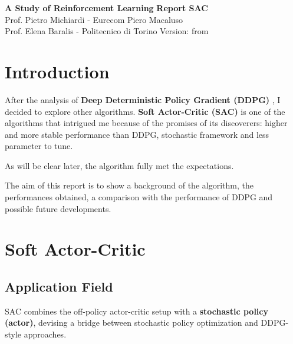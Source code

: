 \documentclass[a4paper, 11pt]{article}
\begin{document}
	\noindent
	\large\textbf{A Study of Reinforcement Learning} \hfill \textbf{Report SAC} \\
	\normalsize Prof. Pietro Michiardi - Eurecom \hfill   Piero Macaluso\\
	\normalsize Prof. Elena Baralis - Politecnico di Torino  \hfill Version: \vhCurrentVersion \space from \vhCurrentDate
	
	\tableofcontents
	\newpage
	\begin{versionhistory}
	\end{versionhistory}
	\newpage
	
	\section{Introduction} \label{introduction}
	
	After the analysis of \textbf{Deep Deterministic Policy Gradient (DDPG)} \cite{lillicrap2015continuous}, I decided to explore other algorithms. \textbf{Soft Actor-Critic (SAC)} \cite{haarnoja2018soft} \cite{haarnoja2018alg} is one of the algorithms that intrigued me because of the promises of its discoverers: higher and more stable performance than DDPG, stochastic framework and less parameter to tune.
	
	As will be clear later, the algorithm fully met the expectations.
	
	The aim of this report is to show a background of the algorithm, the performances obtained, a comparison with the performance of DDPG and possible future developments.
	
	\section{Soft Actor-Critic} \label{sac}
	\subsection{Application Field}

	SAC combines the off-policy actor-critic setup with a \textbf{stochastic policy (actor)}, devising a bridge between stochastic policy optimization and DDPG-style approaches.
	
\end{document}
